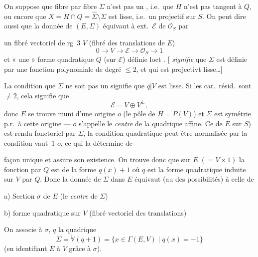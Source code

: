 \documentclass[11pt,a4paper]{article}
\begin{document}
On suppose \struck{\ill{}} que fibre par fibre $\Sigma$ n'est pas un , i.e.\ que $H$ n'est pas tangent à $Q$, ou encore que $X = H \cap Q = \hat{\Sigma} \setminus \Sigma$ est lisse, i.e.\ un \ill{} projectif sur $S$. On peut dire aussi que la donnée de $(E, \Sigma)$ équivaut à  ext.\ $\mathcal{E}$ de $\mathcal{O}_{S}$ par

un fibré vectoriel de rg~3 $V$ (fibré des translations de $E$)
\[
  0 \longrightarrow V \longrightarrow \mathcal{E} \longrightarrow \mathcal{O}_{S} \longrightarrow 1
\]
et « une » forme quadratique  $Q$ (sur $\mathcal{E}$) définie loct . [\ill{} \emph{signifie} que $\Sigma$ est définie par une fonction polynomiale de degré $\leq 2$, et qui est projectivt lisse…]

La condition que $\Sigma$ ne soit pas un  signifie que $q \vert V$ est  lisse. Si les car.\ résid.\ sont $\neq 2$, cela signifie  que
\[
  \mathcal{E} = V \oplus V^{\perp},
\]
donc $E$ se trouve muni  d'une origine $o$ (le pôle de $H = P(V)$)  et $\Sigma$ est  symétrie p.r.\ à cette origine --- $o$ s'appelle le \emph{centre} de la quadrique affine. Ce \struck{\ill{}}  de $E$ sur $S$) est rendu fonctoriel par $\Sigma$,  la condition quadratique peut être normalisée par la condition  vaut~$1$  $o$, ce qui la détermine de

façon unique et assure son existence. On \struck{\ill{}} trouve donc que sur $E \;(= V \times 1)$ \struck{\ill{}}  la fonction  par $Q$ est de la forme $q(x) + 1$ où $q$ est la forme quadratique  induite sur $V$ par $Q$. Donc la donnée de $\Sigma$ dans $E$ équivaut (au \ill{} des possibilités) à celle de

a) Section $\sigma$ de $E$ (le \emph{centre} de $\Sigma$)

b) forme quadratique  sur $V$ (fibré vectoriel des translations)

On associe à $\sigma$, $q$ la quadrique
\[
  \Sigma = \check{\mathbb{V}}(q+1) = \{x \in \Gamma(E, V) \mid q(x) = -1\}
\]
(en identifiant $E$ à $V$ grâce à $\sigma$).
\end{document}
